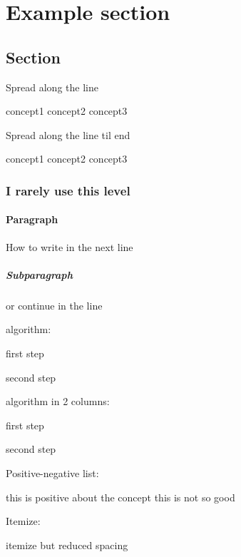 
\section{Example section}

\subsection{Section}
Spread along the line

concept1
\hfil
concept2
\hfil
concept3

Spread along the line til end

concept1
\hfill
concept2
\hfill
concept3

\subsubsection{I rarely use this level}

\paragraph{Paragraph}\mbox{}

How to write in the next line

\subparagraph{Subparagraph}
or continue in the line

algorithm:
\begin{algo}
	\item first step
	\item second step
\end{algo}

algorithm in 2 columns:
\begin{algo2c}
	\item first step
	\item second step
\end{algo2c}

Positive-negative list:
\begin{posNeg}
	\PNpos this is positive about the concept
	\PNneg this is not so good
\end{posNeg}

Itemize:
\begin{itemm}
	\item itemize but reduced spacing
\end{itemm}
